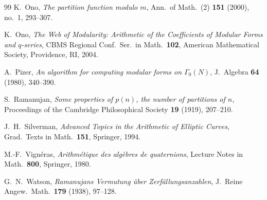 \documentclass[12pt]{amsart}
\theoremstyle{definition}
\theoremstyle{remark}
\begin{document}
\begin{thebibliography}{99}
K.~Ono,
\emph{The partition function modulo $m$},
Ann.\ of Math.\ (2) \textbf{151} (2000), no.~1, 293--307.

 K.~Ono, \emph{The Web of Modularity: Arithmetic of the Coefficients of Modular Forms and $q$-series}, CBMS Regional Conf.\ Ser.\ in Math.\ \textbf{102}, American Mathematical Society, Providence, RI, 2004.


 A.~Pizer, \emph{An algorithm for computing modular forms on $\Gamma_0(N)$}, J.\ Algebra \textbf{64} (1980), 340--390.

S.~Ramanujan, \emph{Some properties of $p(n)$, the number of partitions of $n$,} Proceedings of the Cambridge Philosophical Society \textbf{19} (1919), 207--210.


 J.~H.~Silverman, \emph{Advanced Topics in the Arithmetic of Elliptic Curves}, Grad.\ Texts in Math.\ \textbf{151}, Springer, 1994.

 M.-F.~Vign\'eras, \emph{Arithm\'etique des alg\`ebres de quaternions}, Lecture Notes in Math.\ \textbf{800}, Springer, 1980.

 G.~N.~Watson, \emph{Ramanujans Vermutung \"uber Zerf\"allungsanzahlen}, J.\ Reine Angew.\ Math.\ \textbf{179} (1938), 97--128.
\end{thebibliography}
\end{document}
